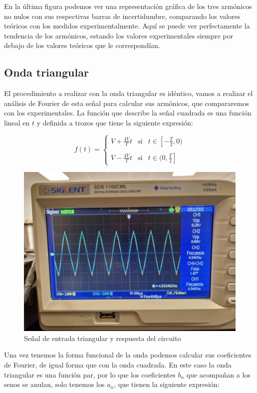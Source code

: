 \documentclass[a4paper,12pt,titlepage]{article}
\begin{document}
En la última figura podemos ver una representación gráfica de los tres armónicos no nulos con sus respectivas barras de incertidumbre, comparando los valores teóricos con los medidos experimentalmente. Aquí se puede ver perfectamente la tendencia de los armónicos, estando los valores experimentales siempre por debajo de los valores teóricos que le correspondían.

\subsection{Onda triangular}

El procedimiento a realizar con la onda triangular es idéntico, vamos a realizar el análisis de Fourier de esta señal para calcular sus armónicos, que compararemos con los experimentales. La función que describe la señal cuadrada es una función lineal en $t$ y definida a trozos que tiene la siguiente expresión:

\begin{equation}
    f(t) = \left\{ \begin{array}{ccc}
        V + \frac{4V}{T} t  & \text{si} & t\in \left[-\frac{T}{2},0)\right. \\ \\
        V -\frac{4V}{T} t & \text{si} & t\in \left.(0,\frac{T}{2}\right]
    \end{array} \right.
\end{equation}

\begin{figure}[h!]
    \centering
    \includegraphics[width=0.5\linewidth]{fourier/onda triangular/triangular1.jpg}
    \caption{Señal de entrada triangular y respuesta del circuito}
    \label{arm_1t}
\end{figure}

Una vez tenemos la forma funcional de la onda podemos calcular sus coeficientes de Fourier, de igual forma que con la onda cuadrada. En este caso la onda triangular es una función par, por lo que los coeficientes $b_n$ que acompañan a los senos se anulan, solo tenemos los $a_n$, que tienen la siguiente expresión:
\end{document}
